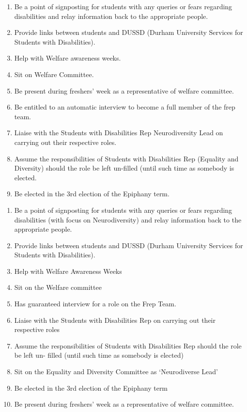 \begin{enumerate}
    \item Be a point of signposting for students with any queries or fears regarding disabilities and relay information back to the appropriate people.
    \item Provide links between students and DUSSD (Durham University Services for Students with Disabilities).
    \item Help with Welfare awareness weeks.
    \item Sit on Welfare Committee.
    \item Be present during freshers’ week as a representative of welfare committee.
    \item Be entitled to an automatic interview to become a full member of the frep team.
    \item Liaise with the Students with Disabilities Rep Neurodiversity Lead on carrying out their respective roles.
    \item Assume the responsibilities of Students with Disabilities Rep (Equality and Diversity) should the role be left un-filled (until such time as somebody is elected.
    \item Be elected in the 3rd election of the Epiphany term.
    
\end{enumerate}

\begin{enumerate}
    \item Be a point of signposting for students with any queries or fears regarding disabilities (with focus on Neurodiversity) and relay information back to the appropriate people.
    \item Provide links between students and DUSSD (Durham University Services for Students with Disabilities).
    \item Help with Welfare Awareness Weeks
    \item Sit on the Welfare committee
    \item Has guaranteed interview for a role on the Frep Team.
    \item Liaise with the Students with Disabilities Rep on carrying out their respective roles
    \item Assume the responsibilities of Students with Disabilities Rep should the role be left un- filled (until such time as somebody is elected)
    \item Sit on the Equality and Diversity Committee as ‘Neurodiverse Lead’
    \item Be elected in the 3rd election of the Epiphany term
    \item Be present during freshers’ week as a representative of welfare committee.
    
\end{enumerate}

